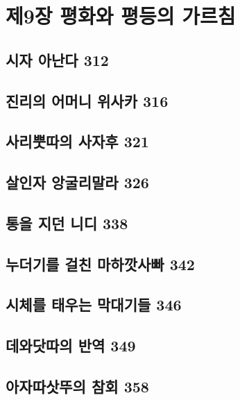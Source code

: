 \documentclass[12pt, a4paper, oneside]{book}
\let\stdsection\section
\renewcommand\section{\newpage\stdsection}
\begin{document}
	\chapter{제9장 평화와 평등의 가르침}
	\noptcrule
	\parttoc				


	\section{시자 아난다 312 }

	\section{진리의 어머니 위사카 316 }

	\section{사리뿟따의 사자후 321 }

	\section{살인자 앙굴리말라 326 }

	\section{통을 지던 니디 338 }

	\section{누더기를 걸친 마하깟사빠 342 }

	\section{시체를 태우는 막대기들 346 }

	\section{데와닷따의 반역 349 }

	\section{아자따삿뚜의 참회 358}


\end{document}
